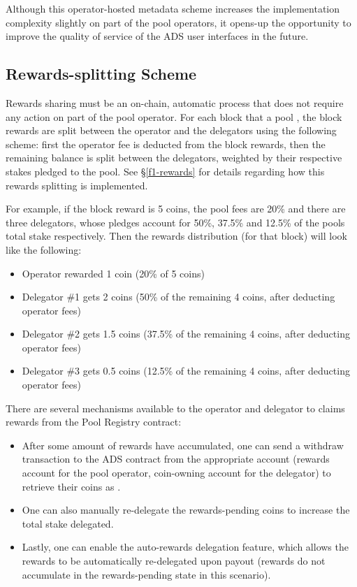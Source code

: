 Although this operator-hosted metadata scheme increases the implementation complexity slightly on part of the pool operators, it opens-up the opportunity to improve the quality of service of the ADS user interfaces in the future. 

\subsection{Rewards-splitting Scheme} \label{rewards_splitting}

Rewards sharing must be an on-chain, automatic process that does not require any action on part of the pool operator. For each block that a pool , the block rewards are split between the operator and the delegators using the following scheme: first the operator fee is deducted from the block rewards, then the remaining balance is split between the delegators, weighted by their respective stakes pledged to the pool. See \S\ref{f1-rewards} for details regarding how this rewards splitting is implemented. 

For example, if the block reward is 5 coins, the pool fees are 20\% and there are three delegators, whose pledges account for 50\%, 37.5\% and 12.5\% of the pools total stake respectively. Then the rewards distribution (for that block) will look like the following: 
\begin{itemize}[label=--,nosep]
    \item Operator rewarded 1 coin (20\% of 5 coins)
    \item Delegator \#1 gets 2 coins (50\% of the remaining 4 coins, after deducting operator fees)
    \item Delegator \#2 gets 1.5 coins (37.5\% of the remaining 4 coins, after deducting operator fees)
    \item Delegator \#3 gets 0.5 coins (12.5\% of the remaining 4 coins, after deducting operator fees)
\end{itemize}

There are several mechanisms available to the operator and delegator to claims rewards from the Pool Registry contract: 
\begin{itemize}[label=--,nosep]
    \item After some amount of rewards have accumulated, one can send a withdraw transaction to the ADS contract from the appropriate account (rewards account for the pool operator, coin-owning account for the delegator) to retrieve their coins as . 
    \item One can also manually re-delegate the rewards-pending coins to increase the total stake delegated. 
    \item Lastly, one can enable the auto-rewards delegation feature, which allows the rewards to be automatically re-delegated upon payout (rewards do not accumulate in the rewards-pending state in this scenario). 
\end{itemize}

